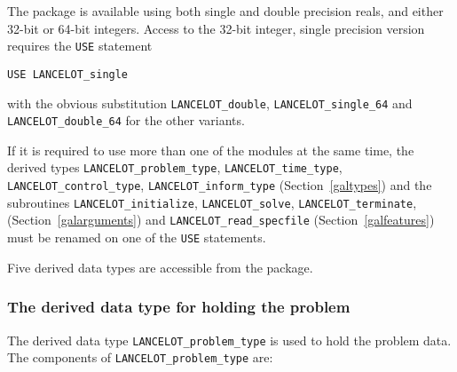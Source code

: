 \documentclass{galahad}
\newcommand{\fullpackagename}{LANC\-E\-LOT}
\begin{document}

\galhowto

The package is available using both single and double precision reals, 
and either 32-bit or 64-bit integers. Access to the 32-bit integer,
single precision version requires the {\tt USE} statement
\medskip

\hspace{8mm} {\tt USE \fullpackagename\_single}

\medskip
\noindent
with the obvious substitution {\tt \fullpackagename\_double},
{\tt \fullpackagename\_single\_64} and 
{\tt \fullpackagename\_double\_64} for the other variants.

\noindent
If it is required to use more than one of the modules at the same time, 
the derived types
{\tt \fullpackagename\_problem\_type},
{\tt \fullpackagename\_\-time\_type},
{\tt \fullpackagename\_control\_type},
{\tt \fullpackagename\_inform\_type}
(Section~\ref{galtypes})
and the subroutines
{\tt \fullpackagename\_init\-ialize},
{\tt \fullpackagename\_\-solve},
{\tt \fullpackagename\_terminate},
(Section~\ref{galarguments})
and
{\tt \fullpackagename\_read\_specfile}
(Section~\ref{galfeatures})
must be renamed on one of the {\tt USE} statements.





\galtypes
Five derived data types are accessible from the package.


\subsubsection{The derived data type for holding the problem}\label{typeprob}
The derived data type {\tt \fullpackagename\_problem\_type} is used to hold
the problem data. The components of
{\tt \fullpackagename\_problem\_type}
are:
\end{document}
